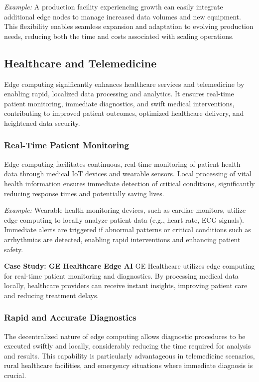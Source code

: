\documentclass[runningheads]{llncs}
\begin{document}
\noindent\textit{Example:} A production facility experiencing growth can easily integrate additional edge nodes to manage increased data volumes and new equipment. This flexibility enables seamless expansion and adaptation to evolving production needs, reducing both the time and costs associated with scaling operations.


\subsection{Healthcare and Telemedicine}

Edge computing significantly enhances healthcare services and telemedicine by enabling rapid, localized data processing and analytics. It ensures real-time patient monitoring, immediate diagnostics, and swift medical interventions, contributing to improved patient outcomes, optimized healthcare delivery, and heightened data security.

\subsubsection{Real-Time Patient Monitoring}
Edge computing facilitates continuous, real-time monitoring of patient health data through medical IoT devices and wearable sensors. Local processing of vital health information ensures immediate detection of critical conditions, significantly reducing response times and potentially saving lives.

\noindent\textit{Example:} Wearable health monitoring devices, such as cardiac monitors, utilize edge computing to locally analyze patient data (e.g., heart rate, ECG signals). Immediate alerts are triggered if abnormal patterns or critical conditions such as arrhythmias are detected, enabling rapid interventions and enhancing patient safety.

\noindent\textbf{Case Study: GE Healthcare Edge AI}
GE Healthcare utilizes edge computing for real-time patient monitoring and diagnostics. By processing medical data locally, healthcare providers can receive instant insights, improving patient care and reducing treatment delays.

\subsubsection{Rapid and Accurate Diagnostics}
The decentralized nature of edge computing allows diagnostic procedures to be executed swiftly and locally, considerably reducing the time required for analysis and results. This capability is particularly advantageous in telemedicine scenarios, rural healthcare facilities, and emergency situations where immediate diagnosis is crucial.
\end{document}
